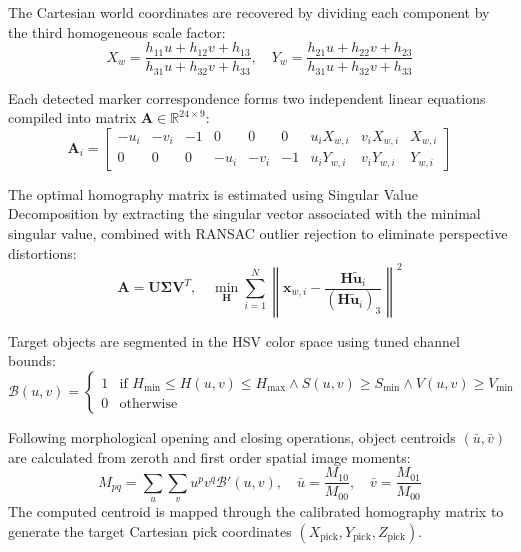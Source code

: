 \documentclass{svproc}
\begin{document}
The Cartesian world coordinates are recovered by dividing each component by the third homogeneous scale factor:
\begin{equation}
    X_w = \frac{h_{11}u + h_{12}v + h_{13}}{h_{31}u + h_{32}v + h_{33}}, \quad Y_w = \frac{h_{21}u + h_{22}v + h_{23}}{h_{31}u + h_{32}v + h_{33}}
\end{equation}

Each detected marker correspondence forms two independent linear equations compiled into matrix $\mathbf{A} \in \mathbb{R}^{24 \times 9}$:
\begin{equation}
    \mathbf{A}_i = \begin{bmatrix} -u_i & -v_i & -1 & 0 & 0 & 0 & u_i X_{w,i} & v_i X_{w,i} & X_{w,i} \\ 0 & 0 & 0 & -u_i & -v_i & -1 & u_i Y_{w,i} & v_i Y_{w,i} & Y_{w,i} \end{bmatrix}
\end{equation}

The optimal homography matrix is estimated using Singular Value Decomposition by extracting the singular vector associated with the minimal singular value, combined with RANSAC outlier rejection to eliminate perspective distortions:
\begin{equation}
    \mathbf{A} = \mathbf{U} \mathbf{\Sigma} \mathbf{V}^T, \quad \min_{\mathbf{H}} \sum_{i=1}^N \left\| \mathbf{x}_{w,i} - \frac{\mathbf{H} \tilde{\mathbf{u}}_i}{(\mathbf{H} \tilde{\mathbf{u}}_i)_3} \right\|^2
\end{equation}

Target objects are segmented in the HSV color space using tuned channel bounds:
\begin{equation}
    \mathcal{B}(u,v) = \begin{cases} 1 & \text{if } H_{\text{min}} \le H(u,v) \le H_{\text{max}} \land S(u,v) \ge S_{\text{min}} \land V(u,v) \ge V_{\text{min}} \\ 0 & \text{otherwise} \end{cases}
\end{equation}

Following morphological opening and closing operations, object centroids $(\bar{u}, \bar{v})$ are calculated from zeroth and first order spatial image moments:
\begin{equation}
    M_{pq} = \sum_{u} \sum_{v} u^p v^q \mathcal{B}'(u,v), \quad \bar{u} = \frac{M_{10}}{M_{00}}, \quad \bar{v} = \frac{M_{01}}{M_{00}}
\end{equation}
The computed centroid is mapped through the calibrated homography matrix to generate the target Cartesian pick coordinates $(X_{\text{pick}}, Y_{\text{pick}}, Z_{\text{pick}})$.
\end{document}
